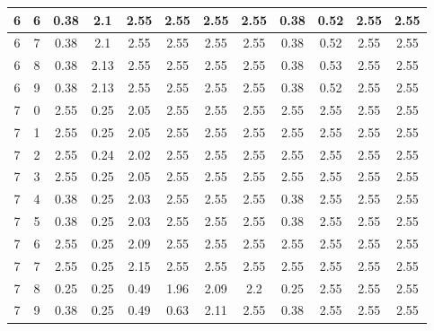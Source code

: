 \begin{longtable}{|c|c||c||c|c|c|c|c||c|c|c|c|}
	6 & 6 & 0.38 & 2.1 & 2.55 & 2.55 & 2.55 & 2.55 & 0.38 & 0.52 & 2.55 & 2.55 \\ \hline
	6 & 7 & 0.38 & 2.1 & 2.55 & 2.55 & 2.55 & 2.55 & 0.38 & 0.52 & 2.55 & 2.55 \\ \hline
	6 & 8 & 0.38 & 2.13 & 2.55 & 2.55 & 2.55 & 2.55 & 0.38 & 0.53 & 2.55 & 2.55 \\ \hline
	6 & 9 & 0.38 & 2.13 & 2.55 & 2.55 & 2.55 & 2.55 & 0.38 & 0.52 & 2.55 & 2.55 \\ \hline
	7 & 0 & 2.55 & 0.25 & 2.05 & 2.55 & 2.55 & 2.55 & 2.55 & 2.55 & 2.55 & 2.55 \\ \hline
	7 & 1 & 2.55 & 0.25 & 2.05 & 2.55 & 2.55 & 2.55 & 2.55 & 2.55 & 2.55 & 2.55 \\ \hline
	7 & 2 & 2.55 & 0.24 & 2.02 & 2.55 & 2.55 & 2.55 & 2.55 & 2.55 & 2.55 & 2.55 \\ \hline
	7 & 3 & 2.55 & 0.25 & 2.05 & 2.55 & 2.55 & 2.55 & 2.55 & 2.55 & 2.55 & 2.55 \\ \hline
	7 & 4 & 0.38 & 0.25 & 2.03 & 2.55 & 2.55 & 2.55 & 0.38 & 2.55 & 2.55 & 2.55 \\ \hline
	7 & 5 & 0.38 & 0.25 & 2.03 & 2.55 & 2.55 & 2.55 & 0.38 & 2.55 & 2.55 & 2.55 \\ \hline
	7 & 6 & 2.55 & 0.25 & 2.09 & 2.55 & 2.55 & 2.55 & 2.55 & 2.55 & 2.55 & 2.55 \\ \hline
	7 & 7 & 2.55 & 0.25 & 2.15 & 2.55 & 2.55 & 2.55 & 2.55 & 2.55 & 2.55 & 2.55 \\ \hline
	7 & 8 & 0.25 & 0.25 & 0.49 & 1.96 & 2.09 & 2.2 & 0.25 & 2.55 & 2.55 & 2.55 \\ \hline
	7 & 9 & 0.38 & 0.25 & 0.49 & 0.63 & 2.11 & 2.55 & 0.38 & 2.55 & 2.55 & 2.55 \\ \hline
\end{longtable}
\clearpage{}
